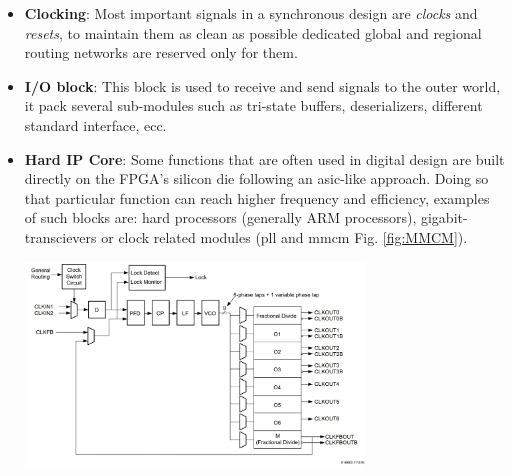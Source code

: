 \documentclass[../../main.tex]{subfiles}
\begin{document}
\begin{itemize}
\begin{minipage}{\linewidth}
    \end{minipage}
    \item \textbf{Clocking}: Most important signals in a synchronous design are \textit{clocks} and \textit{resets}, to maintain them as clean as possible dedicated global and regional routing networks are reserved only for them.  
    \item \textbf{I/O block}: This block is used to receive and send signals to the outer world, it pack several sub-modules such as tri-state buffers, deserializers, different standard interface, ecc.
    \item \textbf{Hard IP Core}: Some functions that are often used in digital design are built directly on the FPGA's silicon die following an \acrshort{asic}-like approach. Doing so that particular function can reach higher frequency and efficiency, examples of such blocks are: hard processors (generally ARM processors), gigabit-transcievers or clock related modules (\acrshort{pll} and \acrshort{mmcm} Fig. \ref{fig:MMCM}).
    \begin{minipage}{\linewidth}
        \centering
        \includegraphics[width=9cm]{sections/04/Images/PLL.jpg}
        \label{fig:MMCM}
    \end{minipage}
\end{itemize}
        
\end{document}

